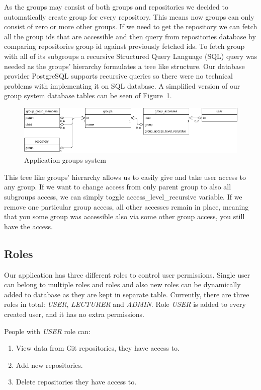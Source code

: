 As the groups may consist of both groups and repositories we decided to automatically create group for every repository.
This means now groups can only consist of zero or more other groups.
If we need to get the repository we can fetch all the group ids that are accessible and then query from repositories database by
comparing repositories group id against previously fetched ids.
To fetch group with all of its subgroups a recursive Structured Query Language (SQL) query was needed as the groups'
hierarchy formulates a tree like structure.
Our database provider PostgreSQL supports recursive queries so there were no technical problems with implementing it on SQL database.
A simplified version of our group system database tables can be seen of Figure~\ref{fig:group-system}.

\begin{figure}[h]
    \includegraphics[width=\textwidth]{figures/group_system}
    \caption{Application groups system}
    \label{fig:group-system}
\end{figure}

This tree like groups' hierarchy allows us to easily give and take user access to any group.
If we want to change access from only parent group to also all subgroups access, we can simply toggle access{\_}level{\_}recursive
variable.
If we remove one particular group access, all other accesses remain in place, meaning that you some group was accessible
also via some other group access, you still have the access.

\subsection{Roles}\label{subsec:roles}
Our application has three different roles to control user permissions.
Single user can belong to multiple roles and roles and also new roles can be dynamically added to database as they are
kept in separate table.
Currently, there are three roles in total: \textit{USER}, \textit{LECTURER} and \textit{ADMIN}.
Role \textit{USER} is added to every created user, and it has no extra permissions.

People with \textit{USER} role can:
\begin{enumerate}
    \item View data from Git repositories, they have access to.
    \item Add new repositories.
    \item Delete repositories they have access to.
\end{enumerate}

